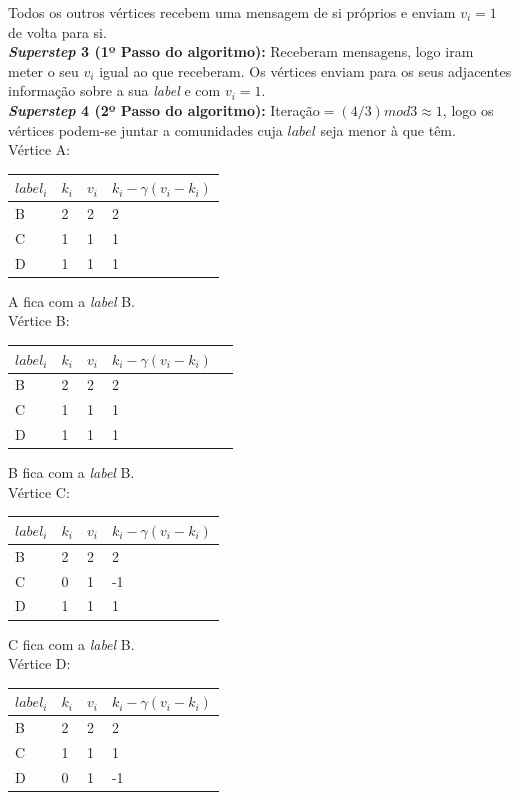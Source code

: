 \documentclass[a4paper,10pt]{report}
\begin{document}
  Todos os outros vértices recebem uma mensagem de si próprios e enviam 
$v_i=1$ de volta para si.
\\[0.25cm]
{\bf \textit{Superstep} 3 (1º Passo do algoritmo):}
Receberam mensagens, logo iram meter o seu $v_i$ igual ao que receberam.
Os vértices enviam para os seus adjacentes informação sobre a sua 
\textit{label} e com $v_i=1$.
\\[0.25cm] 
{\bf \textit{Superstep} 4 (2º Passo do algoritmo):}
Iteração$ = (4/3) mod 3\approx1$, 
logo os vértices podem-se juntar a comunidades cuja $label$ seja menor à que 
têm.
\\[0.25cm]
Vértice A:
  \begin{tabular}{| l | l | l | l |}
  \hline
  $label_i$ & $k_i$ & $v_i$ & $k_i - \gamma(v_i - k_i)$\\ \hline
  B & 2 & 2 & 2 \\ \hline
  C & 1 & 1 & 1 \\ \hline
  D & 1 & 1 & 1 \\ \hline
  \end{tabular}
  A fica com a \textit{label} B.
\\[0.25cm]
Vértice B:
  \begin{tabular}{| l | l | l | l | l |}
  \hline
  $label_i$ & $k_i$ & $v_i$ & $k_i - \gamma(v_i - k_i)$\\ \hline
  B & 2 & 2 & 2 \\ \hline
  C & 1 & 1 & 1  \\ \hline
  D & 1 & 1 & 1  \\ \hline
  \end{tabular}
  B fica com a \textit{label} B.
\\[0.25cm]
Vértice C:
  \begin{tabular}{| l | l | l | l |}
  \hline
  $label_i$ & $k_i$ & $v_i$ & $k_i - \gamma(v_i - k_i)$\\ \hline
  B & 2 & 2 & 2 \\ \hline
  C & 0 & 1 & -1 \\ \hline
  D & 1 & 1 & 1 \\ \hline
  \end{tabular}
  C fica com a \textit{label} B.
\\[0.25cm]
Vértice D:
  \begin{tabular}{| l | l | l | l |}
  \hline
  $label_i$ & $k_i$ & $v_i$ & $k_i - \gamma(v_i - k_i)$\\ \hline
  B & 2 & 2 & 2  \\ \hline
  C & 1 & 1 & 1  \\ \hline
  D & 0 & 1 & -1 \\ \hline
  \end{tabular}  
\end{document}
